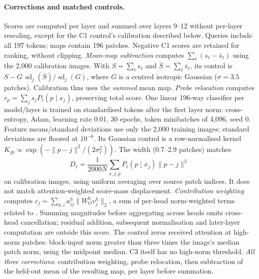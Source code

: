 \paragraph{Corrections and matched controls.} Scores are computed per layer and summed over layers 9--12 without per-layer rescaling, except for the C1 control's calibration described below. Queries include all 197 tokens; maps contain 196 patches. Negative C1 scores are retained for ranking, without clipping.
\emph{Mean-map subtraction} computes $\sum_\ell(s_\ell-\bar s_\ell)$ using the 2,000 calibration images. With $S=\sum_\ell s_\ell$ and $\bar S=\sum_\ell\bar s_\ell$, its control is $S-G\,\operatorname{sd}_j(\bar S)/\operatorname{sd}_j(G)$, where $G$ is a centred isotropic Gaussian ($\sigma=3.5$ patches). Calibration thus uses the \emph{summed} mean map.
\emph{Probe relocation} computes $r_p=\sum_j s_jP_\ell(p\mid x_j)$, preserving total score. One linear 196-way classifier per model/layer is trained on standardised tokens after the first layer norm: cross-entropy, Adam, learning rate 0.01, 30 epochs, token minibatches of 4,096, seed 0. Feature means/standard deviations use only the 2,000 training images; standard deviations are floored at $10^{-6}$. Its Gaussian control is a row-normalised kernel $K_{jp}\propto\exp(-\lVert p-j\rVert^2/(2\sigma_\ell^2))$. The width (0.7--2.9 patches) matches
\[
D_\ell=\frac{1}{2000N}\sum_{x,j,p}P_\ell(p\mid x_j)\lVert p-j\rVert^2
\]
on calibration images, using uniform averaging over source patch indices. It does not match attention-weighted score-mass displacement.
\emph{Contribution weighting} computes $c_j=\sum_{h,i}a_{ij}^h\lVert W_O^hv_j^h\rVert_2$, a sum of per-head norm-weighted terms related to \citet{kobayashi2020}. Summing magnitudes before aggregating across heads omits cross-head cancellation; residual addition, subsequent normalisation and later-layer computation are outside this score. The control zeros received attention at high-norm patches: block-input norm greater than three times the image's median patch norm, using the midpoint median. C3 itself has no high-norm threshold.
\emph{All three corrections}: contribution weighting, probe relocation, then subtraction of the held-out mean of the resulting map, per layer before summation.

